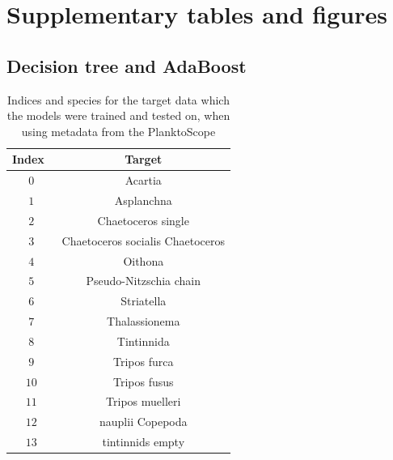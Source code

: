 \appendix
\renewcommand{\thefigure}{S\arabic{figure}}
\renewcommand{\thetable}{S\arabic{table}}
\setcounter{figure}{0}
\setcounter{table}{0}
\section{Supplementary tables and figures}
\subsection{Decision tree and AdaBoost}\label{ap:decision_adaboost}
\begin{table}[h!]
    \centering
    \begin{tabular}{cc}
        \hline
        Index \, & Target \\
        \hline 
        $0$ & Acartia \\
        $1$ & Asplanchna \\
        $2$ & Chaetoceros single \\
        $3$ & Chaetoceros socialis Chaetoceros \\
        $4$ & Oithona \\
        $5$ & Pseudo-Nitzschia chain \\
        $6$ & Striatella \\
        $7$ & Thalassionema \\
        $8$ & Tintinnida \\
        $9$ & Tripos furca \\
        $10$ & Tripos fusus \\
        $11$ & Tripos muelleri \\
        $12$ & nauplii Copepoda \\
        $13$ & tintinnids empty \\
        \hline
    \end{tabular}
    \caption{Indices and species for the target data which the models were trained and tested on, when using metadata from the PlanktoScope}
    \label{tab:target_names}
\end{table}

